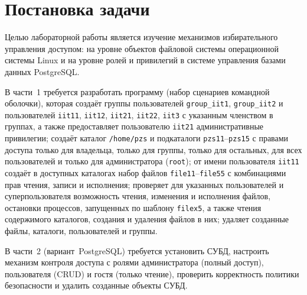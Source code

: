 \section{Постановка задачи}
\label{sec:task}

Целью лабораторной работы является изучение механизмов избирательного управления доступом: на уровне объектов файловой системы операционной системы Linux и на уровне ролей и привилегий в системе управления базами данных PostgreSQL.

В части~1 требуется разработать программу (набор сценариев командной оболочки), которая создаёт группы пользователей \texttt{group\_iit1}, \texttt{group\_iit2} и пользователей \texttt{iit11}, \texttt{iit12}, \texttt{iit21}, \texttt{iit22}, \texttt{iit3} с указанным членством в группах, а также предоставляет пользователю \texttt{iit21} административные привилегии; создаёт каталог \texttt{/home/pzs} и подкаталоги \texttt{pzs11}--\texttt{pzs15} с правами доступа только для владельца, только для группы, только для остальных, для всех пользователей и только для администратора (\texttt{root}); от имени пользователя \texttt{iit11} создаёт в доступных каталогах набор файлов \texttt{file11}--\texttt{file55} с комбинациями прав чтения, записи и исполнения; проверяет для указанных пользователей и суперпользователя возможность чтения, изменения и исполнения файлов, остановки процессов, запущенных по шаблону \texttt{filex5}, а также чтения содержимого каталогов, создания и удаления файлов в них; удаляет созданные файлы, каталоги, пользователей и группы.

В части~2 (вариант~\mdash  PostgreSQL) требуется установить СУБД, настроить механизм контроля доступа с ролями администратора (полный доступ), пользователя (CRUD) и гостя (только чтение), проверить корректность политики безопасности и удалить созданные объекты СУБД.
